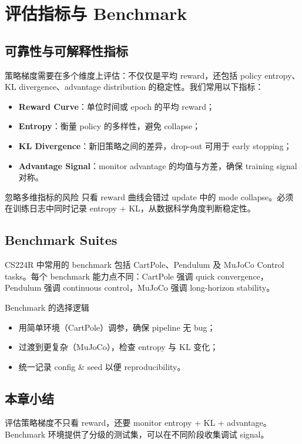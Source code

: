 \section{评估指标与 Benchmark}
\subsection{可靠性与可解释性指标}
策略梯度需要在多个维度上评估：不仅仅是平均 reward，还包括 policy entropy、KL divergence、advantage distribution 的稳定性。我们常用以下指标：
\begin{itemize}
    \item \textbf{Reward Curve}：单位时间或 epoch 的平均 reward；
    \item \textbf{Entropy}：衡量 policy 的多样性，避免 collapse；
    \item \textbf{KL Divergence}：新旧策略之间的差异，drop-out 可用于 early stopping；
    \item \textbf{Advantage Signal}：monitor advantage 的均值与方差，确保 training signal 对称。
\end{itemize}

\begin{warningbox}{忽略多维指标的风险}
只看 reward 曲线会错过 update 中的 mode collapse。必须在训练日志中同时记录 entropy + KL，从数据科学角度判断稳定性。
\end{warningbox}

\subsection{Benchmark Suites}
CS224R 中常用的 benchmark 包括 CartPole、Pendulum 及 MuJoCo Control tasks。每个 benchmark 能力点不同：CartPole 强调 quick convergence，Pendulum 强调 continuous control，MuJoCo 强调 long-horizon stability。

\begin{importantbox}{Benchmark 的选择逻辑}
\begin{itemize}
    \item 用简单环境（CartPole）调参，确保 pipeline 无 bug；
    \item 过渡到更复杂（MuJoCo），检查 entropy 与 KL 变化；
\item 统一记录 config \& seed 以便 reproducibility。
\end{itemize}
\end{importantbox}

\subsection{本章小结}
评估策略梯度不只看 reward，还要 monitor entropy + KL + advantage。Benchmark 环境提供了分级的测试集，可以在不同阶段收集调试 signal。

